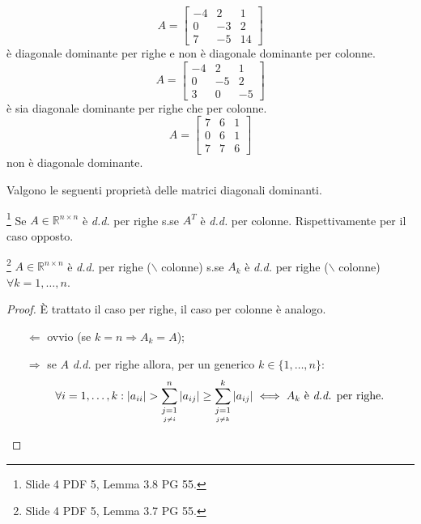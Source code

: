 \begin{example}
    \begin{equation*}
        A=
        \begin{bmatrix}
            -4 & 2 & 1\\
            0 & -3 & 2\\
            7 & -5 & 14
        \end{bmatrix}
    \end{equation*} è diagonale dominante per righe e non è diagonale dominante per colonne.\\
    
    \begin{equation*}
        A=
        \begin{bmatrix}
            -4 & 2 & 1\\
            0 & -5 & 2\\
            3 & 0 & -5
        \end{bmatrix}
    \end{equation*} è sia diagonale dominante per righe che per colonne.\\

    \begin{equation*}
        A=
        \begin{bmatrix}
            7 & 6 & 1\\
            0 & 6 & 1\\
            7 & 7 & 6
        \end{bmatrix}
    \end{equation*} non è diagonale dominante.
\end{example}

Valgono le seguenti proprietà delle matrici diagonali dominanti.
\begin{theorem}\label{th:A_dd_sse_AT_dd}\footnote{Slide 4 PDF 5, Lemma 3.8 PG 55.}
    Se $A\in\mathbb{R}^{n\times n}$ è \textit{d.d.} per righe s.se $A^T$ è \textit{d.d.} per colonne. Rispettivamente per il caso opposto.
\end{theorem}

\begin{theorem}\label{th:matrice_DD_sse_ogni_sottomatrice_DD}\footnote{Slide 4 PDF 5, Lemma 3.7 PG 55.}
    $A\in\mathbb{R}^{n\times n}$ è \textit{d.d.} per righe ($\backslash$ colonne) s.se $A_k$ è \textit{d.d.} per righe ($\backslash$ colonne) $\forall k=1,\hdots,n$.
\end{theorem}
\begin{proof}
    È trattato il caso per righe, il caso per colonne è analogo.
    \begin{itemize}
        \item [$\Leftarrow$] ovvio (se $k=n\Rightarrow A_k=A$);
        \item[$\Rightarrow$] se $A$ \textit{d.d.} per righe allora, per un generico $k\in\{1,\hdots,n\}$:
        \begin{equation*}
            \forall i= 1,\hdots, k: |a_{ii}|> \sum_{\underset{j\neq i}{j=1}}^n|a_{ij}|\geq \sum_{\underset{j\neq k}{j=1}}^k|a_{ij}|\iff A_k\text{ è \textit{d.d.} per righe.}
        \end{equation*}
    \end{itemize}
\end{proof}

